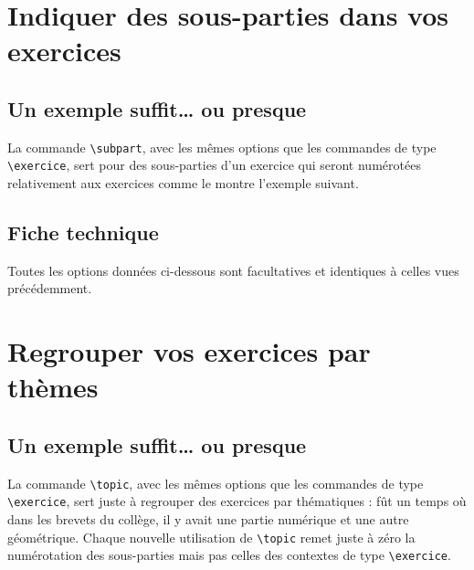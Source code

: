 \documentclass[12pt,a4paper]{scrartcl}
\makeatletter
\theoremstyle{definition}
\newcommand\resetallcnt{
    	\setcounter{lyxam@counter@topic}{0}
    	\setcounter{lyxam@counter@exercise}{0}
    	\setcounter{lyxam@counter@problem}{0}
    	\setcounter{lyxam@counter@bonus}{0}
    	\setcounter{lyxam@counter@subpart}{0}
    }
\newcommand\IDmacro{\@ifstar{\@IDmacroStar}{\@IDmacroNoStar}}
\newcommand\@IDmacroNoStar[3]{%
    \texttt{%
    	\textbackslash#1%
    	\IfStrEq{#2}{0}{}{%
    		\,\,[#2 Option%
			\IfStrEq{#2}{1}{}{s}]%
		}%
	    \IfStrEq{#3}{}{}{%
    		\,\,(#3 Argument%
			\IfStrEq{#3}{1}{}{s})%
		}
   	}
    \immediate\write\tempfile{macro@#1@#2@#3}%
}
\newcommand\@IDmacroStar[2]{%
    \@IDmacroNoStar{#1}{0}{#2}%
}
\makeatother
\begin{document}
\section{Indiquer des sous-parties dans vos exercices}

    \subsection{Un exemple suffit\dots{} ou presque}

La commande \verb+\subpart+, avec les mêmes options que les commandes de type \verb+\exercice+, sert pour des sous-parties d'un exercice qui seront numérotées relativement aux exercices comme le montre l'exemple suivant.

\resetallcnt{}

\begin{tcblisting}{}
\exercise
\subpart
\subpart

\exercise
\subpart
\subpart
\end{tcblisting}


    \subsection{Fiche technique}

Toutes les options données ci-dessous sont facultatives et identiques à celles vues précédemment.

\bigskip


\IDmacro{subpart}{6}{}

\exosoptions{}



\section{Regrouper vos exercices par thèmes}

    \subsection{Un exemple suffit\dots{} ou presque}

La commande \verb+\topic+, avec les mêmes options que les commandes de type \verb+\exercice+, sert juste à regrouper des exercices par thématiques : fût un temps où dans les brevets du collège, il y avait une partie numérique et une autre géométrique.
Chaque nouvelle utilisation de \verb+\topic+ remet juste à zéro la numérotation des sous-parties mais pas celles des contextes de type \verb+\exercice+.
\end{document}
